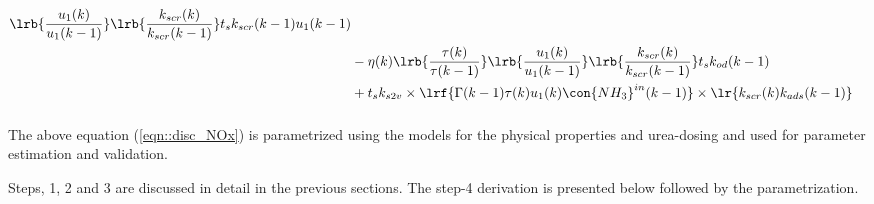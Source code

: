 \begin{enumerate}
\begin{align*}
                                \lrb{\frac{u_1(k)}{u_1(k-1)}}
                                \lrb{\frac{k_{scr}(k)}{k_{scr}(k-1)}}
                t_s k_{scr}(k-1) u_1(k-1)
                \\
                &-\eta(k) \lrb{\frac{\tau(k)}{\tau(k-1)}}
                                \lrb{\frac{u_1(k)}{u_1(k-1)}}
                                \lrb{\frac{k_{scr}(k)}{k_{scr}(k-1)}}
                t_s k_{od}(k-1)
                \\
                &+ t_s k_{s2v} \times \lrf{\Gamma(k-1) \tau(k) u_1(k) \con{NH_3}^{in}(k-1)} \times \lr{k_{scr}(k) k_{ads}(k-1)}
\end{align*}
\begin{equation}
                \label{eqn::disc_NOx}
\end{equation}

\end{enumerate}

The above equation (\ref{eqn::disc_NOx}) is parametrized using the models for the physical properties and
urea-dosing and used for parameter estimation and validation.

Steps, 1, 2 and 3 are discussed in detail in the previous sections. The step-4 derivation is presented below followed by the parametrization.







